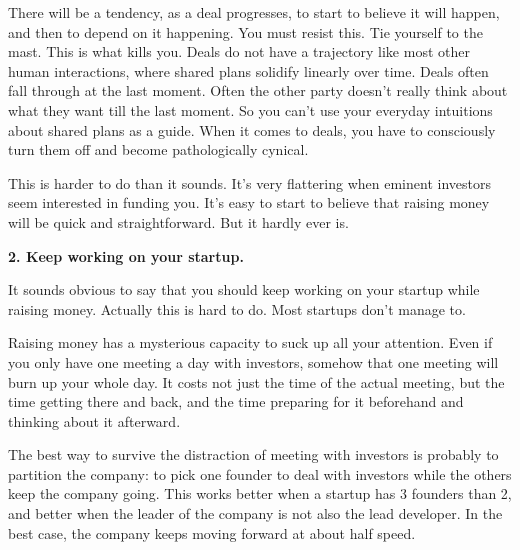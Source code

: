 There will
                    be a tendency, as a deal progresses, to start to believe it
                    will happen, and then to depend on it happening. You must
                    resist this. Tie yourself to the mast. This is what kills
                    you. Deals do not have a trajectory like most other human
                    interactions, where shared plans solidify linearly over
                    time. Deals often fall through at the last moment. Often the
                    other party doesn't really think about what they want till
                    the last moment. So you can't use your everyday intuitions
                    about shared plans as a guide. When it comes to deals, you
                    have to consciously turn them off and become pathologically
                    cynical.

This is harder to do than it sounds.
                    It's very flattering when eminent investors seem interested
                    in funding you. It's easy to start to believe that raising
                    money will be quick and straightforward. But it hardly ever
                    is.


                    \textbf{2. Keep working on your startup.}

It sounds
                    obvious to say that you should keep working on your startup
                    while raising money. Actually this is hard to do. Most
                    startups don't manage to.

Raising money has a
                    mysterious capacity to suck up all your attention. Even if
                    you only have one meeting a day with investors, somehow that
                    one meeting will burn up your whole day. It costs not just
                    the time of the actual meeting, but the time getting there
                    and back, and the time preparing for it beforehand and
                    thinking about it afterward.

The best way to
                    survive the distraction of meeting with investors is
                    probably to partition the company: to pick one founder to
                    deal with investors while the others keep the company going.
                    This works better when a startup has 3 founders than 2, and
                    better when the leader of the company is not also the lead
                    developer. In the best case, the company keeps moving
                    forward at about half speed.

